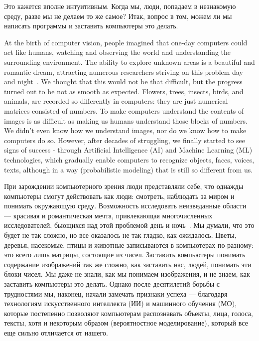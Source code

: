 \begin{Russian}
    Это кажется вполне интуитивным. Когда мы, люди, попадаем в незнакомую среду, разве мы не делаем то же самое? Итак, вопрос в том, можем ли мы написать программы и заставить компьютеры это делать. 
\end{Russian}

\begin{English}
    At the birth of computer vision, people imagined that one-day computers could act like humans, watching and observing the world and understanding the surrounding environment. The ability to explore unknown areas is a beautiful and romantic dream, attracting numerous researchers striving on this problem day and night~\cite{Hartley2003}. We thought that this would not be that difficult, but the progress turned out to be not as smooth as expected. Flowers, trees, insects, birds, and animals, are recorded so differently in computers: they are just numerical matrices consisted of numbers. To make computers understand the contents of images is as difficult as making us humans understand those blocks of numbers. We didn't even know how we understand images, nor do we know how to make computers do so. However, after decades of struggling,  we finally started to see signs of success - through Artificial Intelligence (AI) and Machine Learning (ML) technologies, which gradually enable computers to recognize objects, faces, voices, texts, although in a way (probabilistic modeling) that is still so different from us.
\end{English}

\begin{Russian}
    При зарождении компьютерного зрения люди представляли себе, что однажды компьютеры смогут действовать как люди: смотреть, наблюдать за миром и понимать окружающую среду. Возможность исследовать неизведанные области --- красивая и романтическая мечта, привлекающая многочисленных исследователей, бьющихся над этой проблемой день и ночь~\cite{Hartley2003}. Мы думали, что это будет не так сложно, но все оказалось не так гладко, как ожидалось. Цветы, деревья, насекомые, птицы и животные записываются в компьютерах по-разному: это всего лишь матрицы, состоящие из чисел. Заставить компьютеры понимать содержание изображений так же сложно, как заставить нас, людей, понимать эти блоки чисел. Мы даже не знали, как мы понимаем изображения, и не знаем, как заставить компьютеры это делать. Однако после десятилетий борьбы с трудностями мы, наконец, начали замечать признаки успеха --- благодаря технологиям искусственного интеллекта (ИИ) и машинного обучения (МО), которые постепенно позволяют компьютерам распознавать объекты, лица, голоса, тексты, хотя и некоторым образом (вероятностное моделирование), который все еще сильно отличается от нашего.
\end{Russian}

